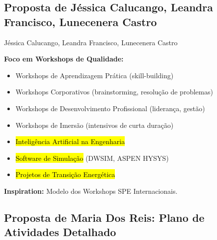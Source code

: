 \documentclass[12pt,a4paper,oneside]{article}
\begin{document}
\vspace{1.2cm}

\subsection{Proposta de Jéssica Calucango, Leandra Francisco, Lunecenera Castro}

\begin{proposalbox}{Jéssica Calucango, Leandra Francisco, Lunecenera Castro}

\textbf{Foco em Workshops de Qualidade:}

\begin{itemize}[label={\color{spe-secondary}▸}]
  \item Workshops de Aprendizagem Prática (skill-building)
  \item Workshops Corporativos (brainstorming, resolução de problemas)
  \item Workshops de Desenvolvimento Profissional (liderança, gestão)
  \item Workshops de Imersão (intensivos de curta duração)
  \item \hl{Inteligência Artificial na Engenharia}
  \item \hl{Software de Simulação} (DWSIM, ASPEN HYSYS)
  \item \hl{Projetos de Transição Energética}
\end{itemize}

\textbf{Inspiration:} Modelo dos Workshops SPE Internacionais.

\end{proposalbox}

\vspace{1.2cm}

\subsection{Proposta de Maria Dos Reis: Plano de Atividades Detalhado}
\end{document}
